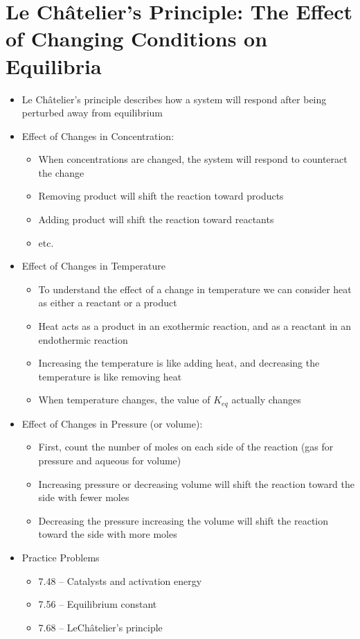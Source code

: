 \documentclass[12pt, openany, letterpaper]{memoir}
\begin{document}
\section{Le Ch\^atelier's Principle: The Effect of Changing Conditions on Equilibria}
\begin{itemize}
	\item Le Ch\^atelier's principle describes how a system will respond after being perturbed away from equilibrium
	\item Effect of Changes in Concentration:
	\begin{itemize}
		\item When concentrations are changed, the system will respond to counteract the change
		\item Removing product will shift the reaction toward products
		\item Adding product will shift the reaction toward reactants
		\item etc.
	\end{itemize}
	\item Effect of Changes in Temperature
	\begin{itemize}
		\item To understand the effect of a change in temperature we can consider heat as either a reactant or a product
		\item Heat acts as a product in an exothermic reaction, and as a reactant in an endothermic reaction
		\item Increasing the temperature is like adding heat, and decreasing the temperature is like removing heat
		\item When temperature changes, the value of $K_{eq}$ actually changes
	\end{itemize}
	\item Effect of Changes in Pressure (or volume):
	\begin{itemize}
		\item First, count the number of moles on each side of the reaction (gas for pressure and aqueous for volume)
		\item Increasing pressure or decreasing volume will shift the reaction toward the side with fewer moles
		\item Decreasing the pressure increasing the volume will shift the reaction toward the side with more moles
	\end{itemize}
	\item Practice Problems
	\begin{itemize}
		\item 7.48 -- Catalysts and activation energy
		\item 7.56 -- Equilibrium constant
		\item 7.68 -- LeCh\^atelier's principle
	\end{itemize}
\end{itemize}
\end{document}
